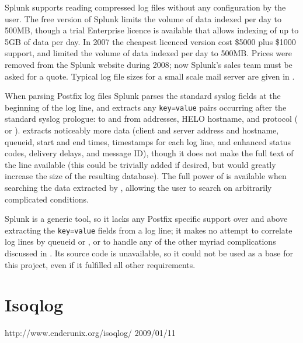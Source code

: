 Splunk supports reading compressed log files without any configuration by
the user.  The free version of Splunk limits the volume of data indexed per
day to 500MB, though a trial Enterprise licence is available that allows
indexing of up to 5GB of data per day.  In 2007 the cheapest licenced
version cost \$5000 plus \$1000 support, and limited the volume of data
indexed per day to 500MB\@.  Prices were removed from the Splunk website
during 2008; now Splunk's sales team must be asked for a quote.  Typical
log file sizes for a small scale mail server are given in
.

When parsing Postfix log files Splunk parses the standard
syslog fields at the beginning of the log line, and extracts
any \texttt{key=value} pairs occurring after the standard syslog prologue:
to and from addresses, HELO hostname, and protocol ( or
).  \parsername{} extracts noticeably more data (client and
server  address and hostname, queueid, start and end times,
timestamps for each log line,  and enhanced status codes,
delivery delays, and message ID), though it does not make the full text of
the line available (this could be trivially added if desired, but would
greatly increase the size of the resulting database).  The full power of
 is available when searching the data extracted by
\parsername{}, allowing the user to search on arbitrarily complicated
conditions.

Splunk is a generic tool, so it lacks any Postfix specific support over and
above extracting the \texttt{key=value} fields from a log line; it makes no
attempt to correlate log lines by queueid or , or to handle
any of the other myriad complications discussed in
.  Its source code is unavailable, so it could
not be used as a base for this project, even if it fulfilled all other
requirements.

\section{Isoqlog}

{http://www.enderunix.org/isoqlog/}
{2009/01/11}

